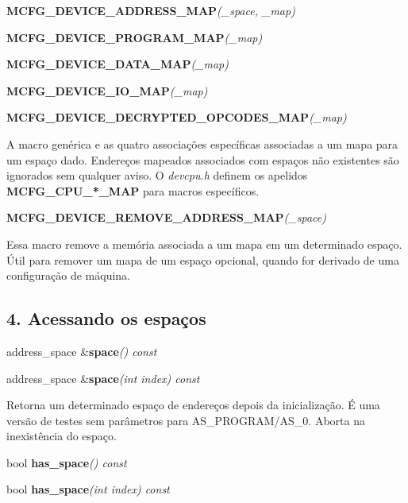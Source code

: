\documentclass[letterpaper,10pt,brazil]{sphinxmanual}
\begin{document}
\begin{DUlineblock}{0em}
\item[] \textbf{MCFG\_DEVICE\_ADDRESS\_MAP}\emph{(\_space, \_map)}
\item[] \textbf{MCFG\_DEVICE\_PROGRAM\_MAP}\emph{(\_map)}
\item[] \textbf{MCFG\_DEVICE\_DATA\_MAP}\emph{(\_map)}
\item[] \textbf{MCFG\_DEVICE\_IO\_MAP}\emph{(\_map)}
\item[] \textbf{MCFG\_DEVICE\_DECRYPTED\_OPCODES\_MAP}\emph{(\_map)}
\end{DUlineblock}

A macro genérica e as quatro associações específicas associadas a um
mapa para um espaço dado. Endereços mapeados associados com espaços não
existentes são ignorados sem qualquer aviso. O \emph{devcpu.h} definem os
apelidos \textbf{MCFG\_CPU\_*\_MAP} para macros específicos.

\begin{DUlineblock}{0em}
\item[] \textbf{MCFG\_DEVICE\_REMOVE\_ADDRESS\_MAP}\emph{(\_space)}
\end{DUlineblock}

Essa macro remove a memória associada a um mapa em um determinado
espaço. Útil para remover um mapa de um espaço opcional, quando for
derivado de uma configuração de máquina.


\subsection{4. Acessando os espaços}
\label{techspecs/device_memory_interface:acessando-os-espacos}
\begin{DUlineblock}{0em}
\item[] address\_space \&\textbf{space}\emph{() const}
\item[] address\_space \&\textbf{space}\emph{(int index) const}
\end{DUlineblock}

Retorna um determinado espaço de endereços depois da inicialização.
É uma versão de testes sem parâmetros para AS\_PROGRAM/AS\_0.
Aborta na inexistência do espaço.

\begin{DUlineblock}{0em}
\item[] bool \textbf{has\_space}\emph{() const}
\item[] bool \textbf{has\_space}\emph{(int index) const}
\end{DUlineblock}
\end{document}
